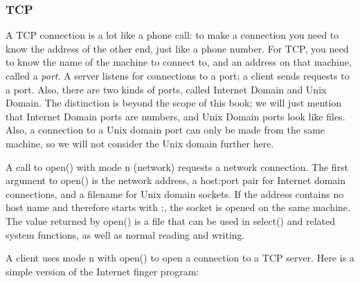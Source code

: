 \subsubsection{TCP}

A TCP connection is a lot like a phone call: to make a connection you
need to know the address of the other end, just like a phone number.
For TCP, you need to know the name of the machine to connect to, and an
address on that machine, called a \textit{port}. A server listens for
connections to a port; a client sends requests to a port. Also, there
are two kinds of ports, called {\textquotedbl}Internet
Domain{\textquotedbl} and {\textquotedbl}Unix Domain.{\textquotedbl}
The distinction is beyond the scope of this book; we will just mention
that Internet Domain ports are numbers, and Unix Domain ports look like
files. Also, a connection to a Unix domain port can only be made from
the same machine, so we will not consider the Unix domain further here.

A call to \textsf{open()} with mode
\textsf{{\textquotedbl}n{\textquotedbl}} (network) requests a network
connection. The first argument to \textsf{open()} is the network
address, a host:port pair for Internet domain connections, and a
filename for Unix domain sockets. If the address contains no host name
and therefore starts with \textsf{{\textquotedbl}:{\textquotedbl}}, the
socket is opened on the same machine. The value returned by
\textsf{open()} is a file that can be used in \textsf{select()} and
related system functions, as well as normal reading and writing. 

A client uses mode
\textsf{{\textquotedbl}n{\textquotedbl}} with \textsf{open()} to open a
connection to a TCP server. Here is a simple version of the Internet
{\textquotedbl}finger{\textquotedbl} program:

